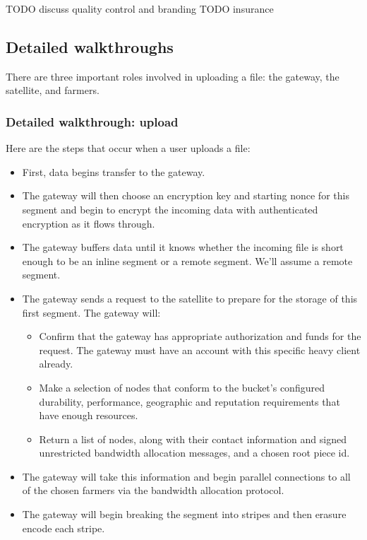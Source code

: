 \documentclass[a4paper,10pt]{article} \usepackage[utf8]{inputenc}
\newcommand{\todo}[1]{{\color{red} TODO #1 }}
\begin{document}
\todo{discuss quality control and branding}
\todo{insurance}

\subsection{Detailed walkthroughs}

There are three important roles involved in uploading a file: the gateway, the 
satellite, and farmers.

\subsubsection{Detailed walkthrough: upload}

Here are the steps that occur when a user uploads a file:

\begin{itemize}
\item First, data begins transfer to the gateway.
\item The gateway will then choose an encryption key and starting nonce for
  this segment and begin to encrypt the incoming data with authenticated
  encryption as it flows through.
\item The gateway buffers data until it knows whether the incoming file is
short enough to be an inline segment or a remote segment. We'll assume a remote
segment.
\item The gateway sends a request to the satellite to prepare for the storage
of this first segment. The gateway will:
  \begin{itemize}
  \item Confirm that the gateway has appropriate authorization and funds for
    the request. The gateway must have an account with this specific heavy
    client already.
  \item Make a selection of nodes that conform to the bucket's configured
    durability, performance, geographic and reputation requirements that have
    enough resources.
  \item Return a list of nodes, along with their contact information and
    signed unrestricted bandwidth allocation messages, and a chosen root piece
    id.
  \end{itemize}
\item The gateway will take this information and begin parallel connections to
  all of the chosen farmers via the bandwidth allocation protocol.
\item The gateway will begin breaking the segment into stripes and then
  erasure encode each stripe.

\end{itemize}
\end{document}
